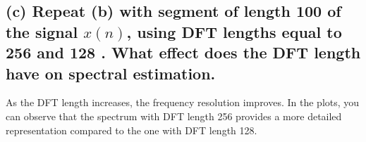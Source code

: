 \subsection*{(c) Repeat (b) with segment of length 100 of the signal $x(n)$, using DFT lengths equal to 256 and 128 .
What effect does the DFT length have on spectral estimation.}


As the DFT length increases, the frequency resolution improves. In the plots, you can observe that the spectrum with DFT length 256 provides a more detailed representation compared to the one with DFT length 128.